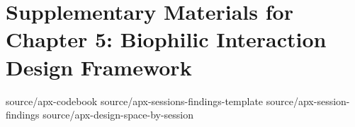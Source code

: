 \chapter{Supplementary Materials for Chapter 5: Biophilic Interaction Design Framework}
\label{app:bidf}

{source/apx-codebook}
{source/apx-sessions-findings-template}
{source/apx-session-findings}
{source/apx-design-space-by-session}